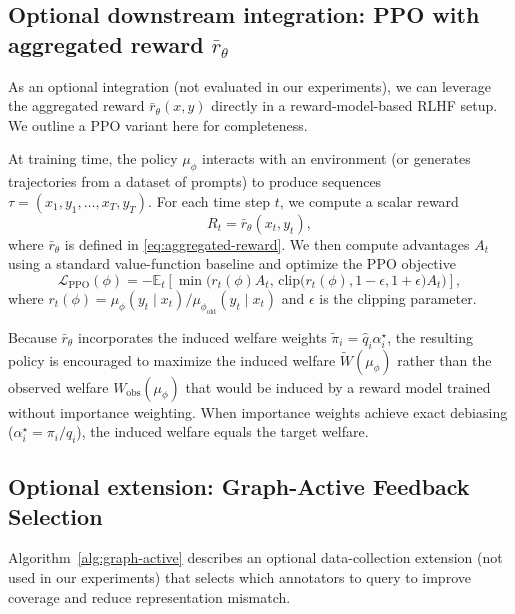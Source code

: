 \documentclass{article}
\theoremstyle{plain}
\theoremstyle{definition}
\theoremstyle{remark}
\begin{document}
\subsection{Optional downstream integration: PPO with aggregated reward $\bar r_\theta$}
\label{app:ppo}

As an optional integration (not evaluated in our experiments), we can leverage
the aggregated reward $\bar r_\theta(x,y)$ directly in a reward-model-based RLHF setup.
We outline a PPO variant here for completeness.

At training time, the policy $\mu_\phi$ interacts with an environment (or
generates trajectories from a dataset of prompts) to produce sequences
$\tau = (x_1, y_1, \dots, x_T, y_T)$. For each time step $t$, we compute a
scalar reward
\begin{equation}
    R_t = \bar r_\theta(x_t, y_t),
\end{equation}
where $\bar r_\theta$ is defined in \eqref{eq:aggregated-reward}. We then
compute advantages $A_t$ using a standard value-function baseline and optimize
the PPO objective
\begin{equation}
    \mathcal{L}_{\text{PPO}}(\phi)
    =
    - \mathbb{E}_t
    \left[
    \min\Big(
        r_t(\phi) A_t,\,
        \text{clip}\big(r_t(\phi), 1 - \epsilon, 1 + \epsilon\big) A_t
    \Big)
    \right],
\end{equation}
where $r_t(\phi) = \mu_\phi(y_t \mid x_t) / \mu_{\phi_{\text{old}}}(y_t \mid x_t)$
and $\epsilon$ is the clipping parameter.

Because $\bar r_\theta$ incorporates the induced welfare weights
$\tilde\pi_i = \hat q_i \alpha_i^\star$, the resulting policy is encouraged
to maximize the induced welfare $\widetilde{W}(\mu_\phi)$ rather than the
observed welfare $W_{\text{obs}}(\mu_\phi)$ that would be induced by a
reward model trained without importance weighting. When importance weights
achieve exact debiasing ($\alpha_i^\star = \pi_i / q_i$), the induced welfare
equals the target welfare.

\subsection{Optional extension: Graph-Active Feedback Selection}
\label{app:active}

Algorithm~\ref{alg:graph-active} describes an optional data-collection extension
(not used in our experiments) that selects which annotators to query to improve
coverage and reduce representation mismatch.
\end{document}
